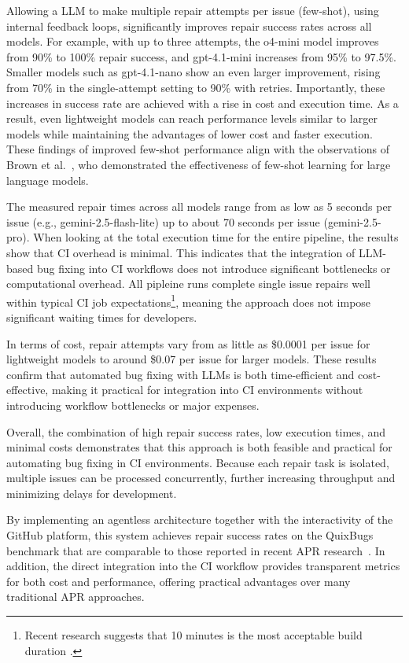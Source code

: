 Allowing a \ac{LLM} to make multiple repair attempts per issue (few-shot), using internal feedback loops, significantly improves repair success rates across all models. For example, with up to three attempts, the o4-mini model improves from 90\% to 100\% repair success, and gpt-4.1-mini increases from 95\% to 97.5\%. Smaller models such as gpt-4.1-nano show an even larger improvement, rising from 70\% in the single-attempt setting to 90\% with retries. Importantly, these increases in success rate are achieved with a rise in cost and execution time. As a result, even lightweight models can reach performance levels similar to larger models while maintaining the advantages of lower cost and faster execution. These findings of improved few-shot performance align with the observations of Brown et al.~\cite{brownLanguageModelsAre2020}, who demonstrated the effectiveness of few-shot learning for large language models.

The measured repair times across all models range from as low as 5 seconds per issue (e.g., gemini-2.5-flash-lite) up to about 70 seconds per issue (gemini-2.5-pro). When looking at the total execution time for the entire pipeline, the results show that \ac{CI} overhead is minimal. This indicates that the integration of LLM-based bug fixing into CI workflows does not introduce significant bottlenecks or computational overhead. All pipleine runs complete single issue repairs well within typical CI job expectations\footnote{Recent research suggests that 10 minutes is the most acceptable build duration \cite{hiltonTradeoffsContinuousIntegration2017}.}, meaning the approach does not impose significant waiting times for developers.

In terms of cost, repair attempts vary from as little as \$0.0001 per issue for lightweight models to around \$0.07 per issue for larger models. These results confirm that automated bug fixing with \acp{LLM} is both time-efficient and cost-effective, making it practical for integration into \ac{CI} environments without introducing workflow bottlenecks or major expenses.

Overall, the combination of high repair success rates, low execution times, and minimal costs demonstrates that this approach is both feasible and practical for automating bug fixing in CI environments. Because each repair task is isolated, multiple issues can be processed concurrently, further increasing throughput and minimizing delays for development.

By implementing an agentless architecture together with the interactivity of the GitHub platform, this system achieves repair success rates on the QuixBugs benchmark that are comparable to those reported in recent APR research~\cite{huCanGPTO1Kill2024, }. In addition, the direct integration into the CI workflow provides transparent metrics for both cost and performance, offering practical advantages over many traditional APR approaches.

